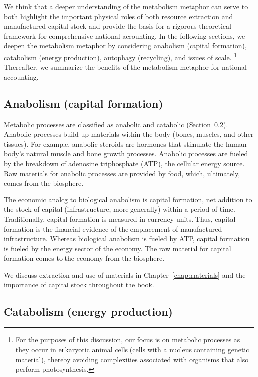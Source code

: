 We think that a deeper understanding of the metabolism metaphor
can serve to both highlight the important physical roles of both
resource extraction and manufactured capital stock and 
provide the basis for a rigorous theoretical framework 
for comprehensive national accounting.
In the following sections, 
we deepen the metabolism metaphor by considering 
anabolism (capital formation),
catabolism (energy production),
autophagy (recycling), and
issues of scale.%
	\footnote{
	For the purposes of this discussion, 
	our focus is on metabolic processes as they occur 
	in eukaryotic animal cells 
	(cells with a nucleus containing genetic material), 
	thereby avoiding complexities associated 
	with organisms that also perform photosynthesis.
	}
Thereafter, we summarize the benefits of the metabolism metaphor
for national accounting.


\subsection{Anabolism (capital formation)}
\label{sec:anabolism}

Metabolic processes are classified as anabolic and catabolic 
(Section~\ref{sec:catabolism}).
Anabolic processes build up materials within the body 
(bones, muscles, and other tissues).
For example, anabolic steroids are hormones that stimulate 
the human body's natural muscle and bone growth processes.
Anabolic processes are fueled by the breakdown 
of adenosine triphosphate (ATP), the cellular energy source.
Raw materials for anabolic processes are provided by food, 
which, ultimately, comes from the biosphere.

The economic analog to biological anabolism is capital formation, 
net addition to the stock of capital (infrastructure, more generally) 
within a period of time.
Traditionally, capital formation is measured in currency units.
Thus, capital formation is the financial evidence 
of the emplacement of manufactured infrastructure.
Whereas biological anabolism is fueled by ATP, 
capital formation is fueled by the energy sector of the economy.
The raw material for capital formation comes to the 
economy from the biosphere.

We discuss extraction and use of materials in Chapter~\ref{chap:materials}
and the importance of capital stock throughout the book.


\subsection{Catabolism (energy production)}
\label{sec:catabolism}

